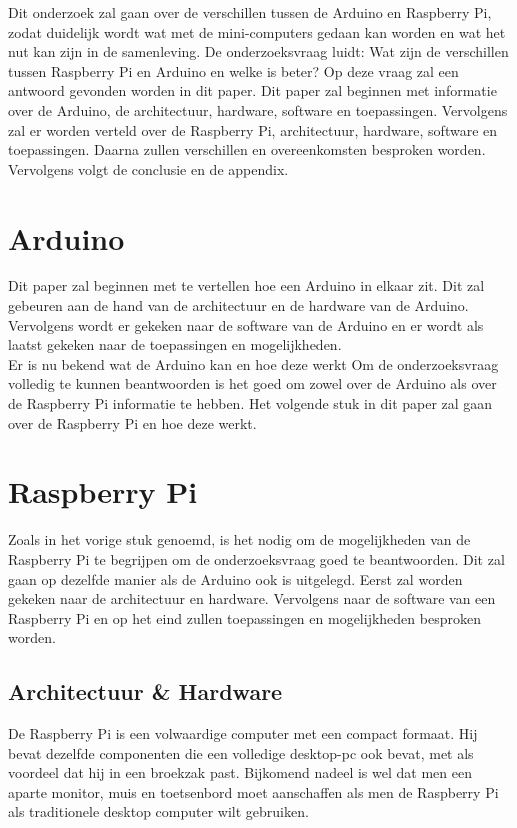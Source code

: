 \documentclass[a4paper, dutch, abstract=true]{scrartcl}
\begin{document}
Dit onderzoek zal gaan over de verschillen tussen de Arduino en Raspberry Pi, zodat duidelijk wordt
wat met de mini-computers gedaan kan worden en wat het nut kan zijn in de samenleving.
De onderzoeksvraag luidt: Wat zijn de verschillen tussen Raspberry Pi en Arduino en welke is beter?
Op deze vraag zal een antwoord gevonden worden in dit paper.
Dit paper zal beginnen met informatie over de Arduino, de architectuur, hardware, software en
toepassingen.
Vervolgens zal er worden verteld over de Raspberry Pi, architectuur, hardware, software en
toepassingen.
Daarna zullen verschillen en overeenkomsten besproken worden.
Vervolgens volgt de conclusie en de appendix.

\section{Arduino}
Dit paper zal beginnen met te vertellen hoe een Arduino in elkaar zit.
Dit zal gebeuren aan de hand van de architectuur en de hardware van de Arduino.
Vervolgens wordt er gekeken naar de software van de Arduino en er wordt als laatst gekeken naar de
toepassingen en mogelijkheden.
\\

Er is nu bekend wat de Arduino kan en hoe deze werkt
Om de onderzoeksvraag volledig te kunnen beantwoorden is het goed om zowel over de Arduino als over
de Raspberry Pi informatie te hebben.
Het volgende stuk in dit paper zal gaan over de Raspberry Pi en hoe deze werkt.

\section{Raspberry Pi}
Zoals in het vorige stuk genoemd, is het nodig om de mogelijkheden van de Raspberry Pi te
begrijpen om de onderzoeksvraag goed te beantwoorden.
Dit zal gaan op dezelfde manier als de Arduino ook is uitgelegd.
Eerst zal worden gekeken naar de architectuur en hardware.
Vervolgens naar de software van een Raspberry Pi en op het eind zullen toepassingen en mogelijkheden
besproken worden.

\subsection{Architectuur \& Hardware}
De Raspberry Pi is een volwaardige computer met een compact formaat.
Hij bevat dezelfde componenten die een volledige desktop-pc ook bevat, met als voordeel dat hij in
een broekzak past.
Bijkomend nadeel is wel dat men een aparte monitor, muis en toetsenbord moet aanschaffen als men de
Raspberry Pi als traditionele desktop computer wilt gebruiken.
\end{document}
